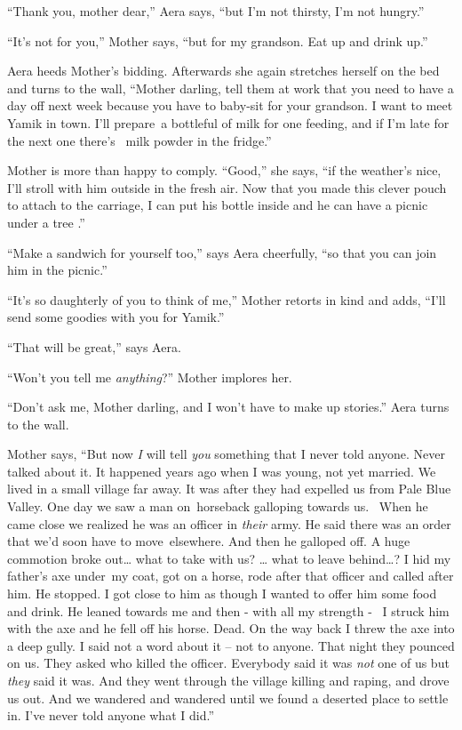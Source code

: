 \documentclass[twoside,11pt]{book}
\begin{document}
``Thank you, mother dear,'' Aera says, ``but I'm not thirsty, I'm not
hungry.''

``It's not for you,'' Mother says, ``but for my grandson. Eat up and drink
up.''

Aera heeds Mother's bidding. Afterwards she again stretches herself on the bed and turns to the wall,
``Mother darling, tell them at work that you need to have a day off next week because you have to baby-sit
for your grandson. I want to meet Yamik in town. I'll prepare~a bottleful of milk for one feeding, and if I'm late for
the next one there's ~milk powder in the fridge.''

Mother is more than happy to comply. ``Good,'' she says, ``if the weather's nice, I'll stroll with him
outside in the fresh air. Now that you made this clever pouch to attach to the carriage, I can put his bottle inside
and he can have a picnic under a tree .''

``Make a sandwich for yourself too,'' says Aera cheerfully, ``so that you can
join him in the picnic.''

``It's so daughterly of you to think of me,'' Mother retorts in kind and adds,
``I'll send some goodies with you for Yamik.''

``That will be great,'' says Aera.

``Won't you tell me \textit{anything}?'' Mother implores her.

``Don't ask me, Mother darling, and I won't have to make up stories.'' Aera turns to the wall.

Mother says, ``But now \textit{I }will tell \textit{you} something that I never told anyone. Never talked
about it. It happened years ago when I was young, not yet married. We lived in a small village far away. It was after
they had expelled us from Pale Blue Valley. One day we saw a man on~horseback galloping towards us. ~When he came close
we realized he was an officer in \textit{their} army. He said there was an order that we'd soon have to move~elsewhere.
And then he galloped off. A huge commotion broke out{\dots} what to take with us? {\dots} what to leave behind{\dots}?
I hid my father's axe under~my coat, got on a horse, rode after that officer and called after him. He stopped. I got
close to him as though I wanted to offer him some food and drink. He leaned towards me and then - with all my strength
- \ I struck him with the axe and he fell off his horse. Dead. On the way back I threw the axe into a deep gully. I
said not a word about it -- not to anyone. That night they pounced on us. They asked who killed the officer. Everybody
said it was \textit{not} one of us but \textit{they} said it was. And they went through the village killing and raping,
and drove us out. And we wandered and wandered until we found a deserted place to settle in. I've never told anyone
what I did.''
\end{document}
